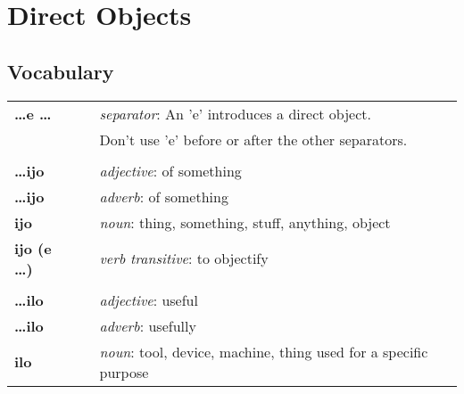 \section{Direct Objects}
%
\subsection*{Vocabulary}
%
\begin{supertabular}{p{2,5cm}|ll}
    \textbf{\dots e \dots}    &  & \textit{separator}: An 'e' introduces a direct object.                                  \\ && Don't use 'e' before or after the other separators. \\ %
                              &  &                                                                                         \\ %
    \textbf{\dots ijo}        &  & \textit{adjective}: of something                                                        \\ %
    \textbf{\dots ijo}        &  & \textit{adverb}: of something                                                           \\ %
    \textbf{ijo}              &  & \textit{noun}: thing, something, stuff, anything, object                                \\ %
    \textbf{ijo (e \dots)}    &  & \textit{verb transitive}: to objectify                                                  \\ %
                              &  &                                                                                         \\ %
    \textbf{\dots ilo}        &  & \textit{adjective}: useful                                                              \\ %
    \textbf{\dots ilo}        &  & \textit{adverb}: usefully                                                               \\ %
    \textbf{ilo}              &  & \textit{noun}: tool, device, machine, thing used for a specific purpose                 \\ %

\end{supertabular}

